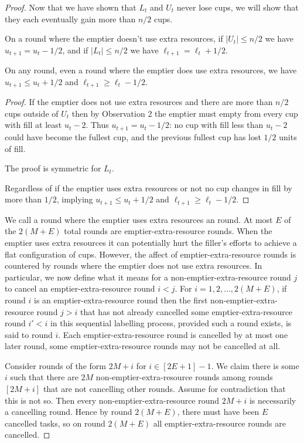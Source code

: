 \begin{proof}
  Now that we have shown that $L_t$ and $U_t$ never lose cups, we will show
  that they each eventually gain more than $n/2$ cups.

  \begin{clm}
    \label{clm:howDoLandUchange}
    On a round where the emptier doesn't use extra resources, if
    $|U_t| \le n/2$ we have $u_{t+1} = u_t -1/2$, and if $|L_t|
    \le n/2$ we have $\ell_{t+1} = \ell_t+ 1/2$.

    On any round, even a round where the emptier does use extra
    resources, we have $u_{t+1} \le u_t + 1/2$ and $\ell_{t+1} \ge \ell_t - 1/2$.
  \end{clm}
  \begin{proof}
    If the emptier does not use extra resources and there are
    more than $n/2$ cups outside of $U_t$ then by
    Observation 2 the emptier must empty from
    every cup with fill at least $u_t-2$. Thus $u_{t+1} = u_t -1/2$: no cup
    with fill less than $u_t-2$ could have become the fullest cup, and the
    previous fullest cup has lost $1/2$ units of fill. 

    The proof is symmetric for $L_t$.

    Regardless of if the emptier uses extra resources or not no
    cup changes in fill by more than $1/2$, implying $u_{t+1} \le
    u_t + 1/2$ and $\ell_{t+1} \ge \ell_t - 1/2$. 
  \end{proof}
  
  We call a round where the emptier uses extra resources an
   round. At most $E$ of the
  $2(M+E)$ total rounds are emptier-extra-resource rounds. When
  the emptier uses extra resources it can potentially hurt the
  filler's efforts to achieve a flat configuration of cups.
  However, the affect of emptier-extra-resource rounds is
  countered by rounds where the emptier does not use extra
  resources. In particular, we now define what it means for a
  non-emptier-extra-resource round $j$ to cancel an
  emptier-extra-resource round $i < j$. For $i = 1,2,\ldots,
  2(M+E)$, if round $i$ is an emptier-extra-resource round then
  the first non-emptier-extra-resource round $j > i$ that has not
  already cancelled some emptier-extra-resource round $i' < i$ in
  this sequential labelling process, provided such a round
  exists, is said to  round $i$. Each
  emptier-extra-resource round is cancelled by at most one later
  round, some emptier-extra-resource rounds may not be cancelled
  at all.

  Consider rounds of the form $2M + i$ for $i \in [2E+1]-1$. We
  claim there is some $i$ such that there are $2M$
  non-emptier-extra-resource rounds among rounds $[2M + i]$ that
  are not cancelling other rounds. Assume for contradiction that
  this is not so. Then every non-emptier-extra-resource round $2M + i$
  is necessarily a cancelling round. Hence by round $2(M + E)$,
  there must have been $E$ cancelled tasks, so on round $2(M+E)$
  all emptier-extra-resource rounds are cancelled.


\end{proof}
